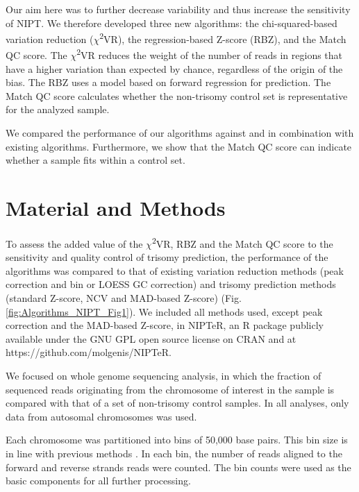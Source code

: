 Our aim here was to further decrease variability and thus increase the sensitivity of NIPT. 
We therefore developed three new algorithms: the chi-squared-based variation reduction ($\chi$\textsuperscript{2}VR), the regression-based Z-score (RBZ), and the Match QC score. 
The $\chi$\textsuperscript{2}VR reduces the weight of the number of reads in regions that have a higher variation than expected by chance, regardless of the origin of the bias. 
The RBZ uses a model based on forward regression for prediction. 
The Match QC score calculates whether the non-trisomy control set is representative for the analyzed sample.

We compared the performance of our algorithms against and in combination with existing algorithms.
Furthermore, we show that the Match QC score can indicate whether a sample fits within a control set.


\section{Material and Methods}\label{Methods}
To assess the added value of the $\chi$\textsuperscript{2}VR, RBZ and the Match QC score to the sensitivity and quality control of trisomy prediction, the performance of the algorithms was compared to that of existing variation reduction methods (peak correction and bin or LOESS GC correction) and trisomy prediction methods (standard Z-score, NCV and MAD-based Z-score) (Fig. \ref{fig:Algorithms_NIPT_Fig1}). 
We included all methods used, except peak correction and the MAD-based Z-score, in NIPTeR, an R package publicly available under the GNU GPL open source license on CRAN and at https://github.com/molgenis/NIPTeR.

We focused on whole genome sequencing analysis, in which the fraction of sequenced reads originating from the chromosome of interest in the sample is compared with that of a set of non-trisomy control samples. 
In all analyses, only data from autosomal chromosomes was used.

Each chromosome was partitioned into bins of 50,000 base pairs. This bin size is in line with previous methods \cite{Fan_2008,Chen_2011,Lau_2012,Palomaki_2012,Fan_2010}. 
In each bin, the number of reads aligned to the forward and reverse strands reads were counted. The bin counts were used as the basic components for all further processing.

